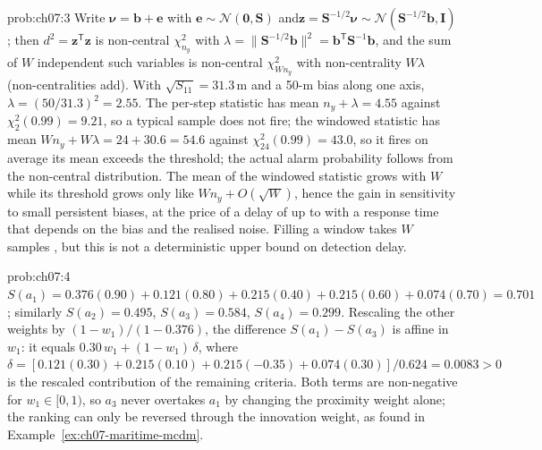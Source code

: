 \documentclass[graybox,envcountchap]{style/SNmono}
\providecommand{\DIFadd}[1]{{\protect\color{blue} #1}} %
\providecommand{\DIFdel}[1]{{\protect\color{red} #1}} %
\providecommand{\DIFaddbegin}{} %
\providecommand{\DIFaddend}{} %
\providecommand{\DIFdelbegin}{} %
\providecommand{\DIFdelend}{} %
\begin{document}
\begin{sol}{prob:ch07:3}
Write $\boldsymbol{\nu}=\mathbf{b}+\mathbf{e}$ with $\mathbf{e}\sim\mathcal{N}(\mathbf{0},\mathbf{S})$ and\DIFaddbegin \allowbreak \DIFaddend $\mathbf{z}=\mathbf{S}^{-1/2}\boldsymbol{\nu}\sim\mathcal{N}(\mathbf{S}^{-1/2}\mathbf{b},\mathbf{I})$; then $d^{2}=\mathbf{z}^{\mathsf T}\mathbf{z}$ is non-central $\chi^{2}_{n_y}$ with $\lambda=\|\mathbf{S}^{-1/2}\mathbf{b}\|^{2}=\mathbf{b}^{\mathsf T}\mathbf{S}^{-1}\mathbf{b}$, and the sum of $W$ independent such variables is non-central $\chi^{2}_{Wn_y}$ with non-centrality $W\lambda$ (non-centralities add). With $\sqrt{S_{11}}=31.3$\,m and a 50-m bias along one axis, $\lambda=(50/31.3)^{2}=2.55$. The per-step statistic has mean $n_y+\lambda=4.55$ against $\chi^{2}_{2}(0.99)=9.21$, so a typical sample does not fire; the windowed statistic has mean $Wn_y+W\lambda=24+30.6=54.6$ against $\chi^{2}_{24}(0.99)=43.0$, so \DIFdelbegin \DIFdel{it fires on average}\DIFdelend \DIFaddbegin \DIFadd{its mean exceeds the threshold; the actual alarm probability follows from the non-central distribution}\DIFaddend . The mean of the windowed statistic grows with $W$ while its threshold grows only like $Wn_y+O(\sqrt{W})$, hence the gain in sensitivity to small persistent biases, \DIFdelbegin \DIFdel{at the price of a delay of up to }\DIFdelend \DIFaddbegin \DIFadd{with a response time that depends on the bias and the realised noise. Filling a window takes }\DIFaddend $W$ samples\DIFaddbegin \DIFadd{, but this is not a deterministic upper bound on detection delay}\DIFaddend .
\end{sol}
\begin{sol}{prob:ch07:4}
$S(a_1)=0.376(0.90)+0.121(0.80)+0.215(0.40)+0.215(0.60)+0.074(0.70)=0.701$; similarly $S(a_2)=0.495$, $S(a_3)=0.584$, $S(a_4)=0.299$. Rescaling the other weights by $(1-w_1)/(1-0.376)$, the difference $S(a_1)-S(a_3)$ is affine in $w_1$: it equals $0.30\,w_1+(1-w_1)\,\delta$, where $\delta=[0.121(0.30)+0.215(0.10)+0.215(-0.35)+0.074(0.30)]/0.624=0.0083>0$ is the rescaled contribution of the remaining criteria. Both terms are non-negative for $w_1\in[0,1)$, so $a_3$ never overtakes $a_1$ by changing the proximity weight alone; the ranking can only be reversed through the innovation weight, as found in Example~\ref{ex:ch07-maritime-mcdm}.
\end{sol}
\end{document}
